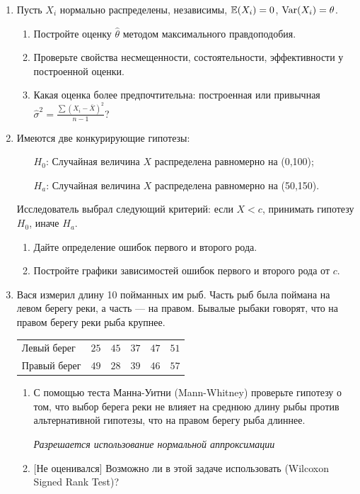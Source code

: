 \begin{enumerate}
\item Пусть $X_{i}$ нормально распределены, независимы, $\operatorname{\mathbb{E}}(X_{i})=0$,
$\operatorname{Var}(X_{i})=\theta$.
\begin{enumerate}
\item Постройте оценку $\hat{\theta}$ методом максимального
правдоподобия.
\item Проверьте свойства несмещенности, состоятельности,
эффективности у построенной оценки.
\item Какая оценка более предпочтительна: построенная или
привычная
$\hat{\sigma}^{2}=\frac{\sum(X_{i}-\bar{X})^{2}}{n-1}$?
\end{enumerate}

\item Имеются две конкурирующие гипотезы:
\begin{enumerate}
\item[$H_0$:] Случайная величина $X$ распределена равномерно на (0,100);
\item[$H_a$:] Случайная величина $X$ распределена равномерно на (50,150).
\end{enumerate}
Исследователь выбрал следующий критерий: если $X<c$, принимать гипотезу $H_0$, иначе  $H_a$.
\begin{enumerate}
\item Дайте определение ошибок первого и второго рода.
\item Постройте графики зависимостей ошибок первого и второго рода от $c$.
\end{enumerate}

\item Вася измерил длину 10 пойманных им рыб. Часть рыб была поймана на
левом берегу реки, а часть — на правом. Бывалые рыбаки говорят,
что на правом берегу реки рыба крупнее.

\begin{tabular}{@{}lccccc@{}}
\toprule
Левый берег  & $25$ & $45$ & $37$ & $47$ & $51$ \\
Правый берег & $49$ & $28$ & $39$ & $46$ & $57$ \\ \bottomrule
\end{tabular}
\begin{enumerate}
\item С помощью теста Манна-Уитни (Mann-Whitney) проверьте
гипотезу о том, что выбор берега реки не влияет на среднюю длину
рыбы против
альтернативной гипотезы, что на правом берегу рыба длиннее.

\emph{Разрешается использование нормальной аппроксимации}
\item{} $[$Не оценивался$]$ Возможно ли в этой задаче использовать
(Wilcoxon Signed Rank Test)?
\end{enumerate}
\end{enumerate}

